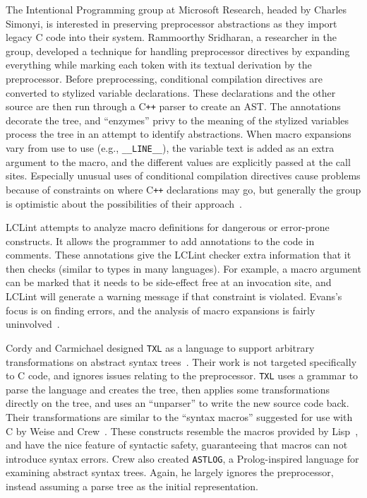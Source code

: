 \documentclass{article}
\newcommand{\CPP}{\mbox{\textsf{C\texttt{++}}}}
\newcommand{\C}{\mbox{\textsf{C}}}
\newcommand{\eg}{e.g.,}
\begin{document}
The Intentional Programming group at Microsoft Research, headed by
Charles Simonyi, is interested in preserving preprocessor abstractions
as they import legacy \C{} code into their system.  Rammoorthy
Sridharan, a researcher in the group, developed a technique for handling
preprocessor directives by expanding everything while marking each token
with its textual derivation by the preprocessor.  Before preprocessing,
conditional compilation directives are converted to stylized variable
declarations. These declarations and the other source are then run
through a \CPP{} parser to create an AST.  The annotations decorate the
tree, and ``enzymes''
 privy to the meaning of the
stylized variables process the tree in an attempt to identify
abstractions.  When macro expansions vary from use to use (\eg{}
\texttt{\_\_LINE\_\_}), the variable text is added as an extra argument
to the macro, and the different values are explicitly passed at the call
sites. Especially unusual uses of conditional compilation directives
cause problems because of constraints on where \CPP{} declarations may
go, but generally the group is optimistic about the possibilities of
their approach~\cite{MSIPPersonal}.

LCLint attempts to analyze macro definitions for dangerous or
error-prone constructs.  It allows the programmer to add annotations to
the code in comments.  These annotations give the LCLint checker extra
information that it then checks (similar to types in many languages).
For example, a macro argument can be marked that it needs to be
side-effect free at an invocation site, and LCLint will generate a
warning message if that constraint is violated.  Evans's focus is on
finding errors, and the analysis of macro expansions is fairly
uninvolved~\cite[Ch.~8]{LCLint}.

Cordy and Carmichael designed \texttt{TXL} as a language to support
arbitrary transformations on abstract syntax trees~\cite{TXL}.  Their
work is not targeted specifically to \C{} code, and ignores issues
relating to the preprocessor.  \texttt{TXL} uses a grammar to parse the
language and creates the tree, then applies some transformations
directly on the tree, and uses an ``unparser'' to write the new source
code back.  Their transformations are similar to the ``syntax macros''
suggested for use with \C{} by Weise and Crew~\cite{Weise93}.  These
constructs resemble the macros provided by Lisp~\cite{Steele90}, and
have the nice feature of syntactic safety, guaranteeing that macros can
not introduce syntax errors. Crew also created \texttt{ASTLOG}, a
\textsf{Prolog}-inspired language for examining abstract syntax trees.
Again, he largely ignores the preprocessor, instead assuming a parse
tree as the initial representation.
\end{document}
